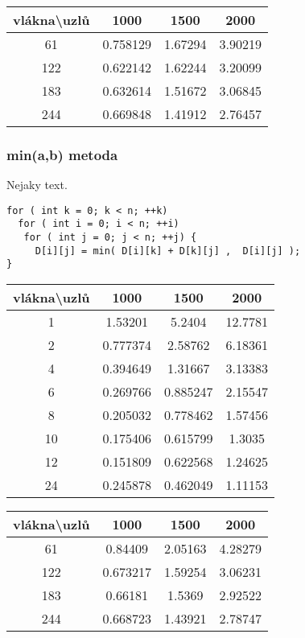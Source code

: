 \documentclass[a4paper,11pt]{article}
\begin{document}
\begin{tabular}{|c|c|c|c|}
	\hline vlákna\textbackslash  uzlů  & 1000 & 1500 & 2000 \\ 
	\hline 61 & 0.758129 & 1.67294 & 3.90219 \\ 
	\hline 122 & 0.622142 & 1.62244 & 3.20099 \\ 
	\hline 183 & 0.632614 & 1.51672 & 3.06845 \\ 
	\hline 244 & 0.669848 & 1.41912 & 2.76457 \\ 
	\hline 
\end{tabular} 

\subsubsection{min(a,b) metoda}
Nejaky text.
\lstset {language=C++}
\begin{lstlisting}
for ( int k = 0; k < n; ++k)
  for ( int i = 0; i < n; ++i) 
   for ( int j = 0; j < n; ++j) {
     D[i][j] = min( D[i][k] + D[k][j] ,  D[i][j] );
}
\end{lstlisting}

\begin{tabular}{|c|c|c|c|}
	\hline vlákna\textbackslash  uzlů & 1000 & 1500 & 2000 \\ 
	\hline 1 & 1.53201 & 5.2404 & 12.7781 \\ 
	\hline 2 & 0.777374 & 2.58762 & 6.18361 \\ 
	\hline 4 & 0.394649 & 1.31667 & 3.13383 \\ 
	\hline 6 & 0.269766 & 0.885247 & 2.15547 \\ 
	\hline 8 & 0.205032 & 0.778462 & 1.57456 \\ 
	\hline 10 & 0.175406 & 0.615799 & 1.3035 \\ 
	\hline 12 & 0.151809 & 0.622568 & 1.24625 \\ 
	\hline 24 & 0.245878 & 0.462049 & 1.11153 \\ 
	\hline 
\end{tabular} 

\begin{tabular}{|c|c|c|c|}
	\hline vlákna\textbackslash  uzlů & 1000 & 1500 & 2000 \\ 
	\hline 61 & 0.84409 & 2.05163 & 4.28279 \\ 
	\hline 122 & 0.673217 & 1.59254 & 3.06231 \\ 
	\hline 183 & 0.66181 & 1.5369 & 2.92522 \\ 
	\hline 244 & 0.668723 & 1.43921 & 2.78747 \\ 
	\hline 
\end{tabular} 
\end{document}
